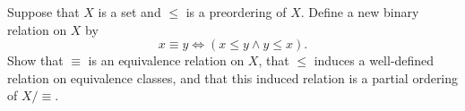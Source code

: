 \begin{problem}[9]
  Suppose that $X$ is a set and $\le$ is a preordering of $X$.
  Define a new binary relation on $X$ by
  \[ x \equiv y \iff (x \le y \land  y \le x). \]
  Show that $\equiv$ is an equivalence relation on $X$,
  that $\le$ induces a well-defined relation on equivalence classes,
  and that this induced relation is a partial ordering of $X/\equiv$.
  
\end{problem}
\begin{Answer}
  
\end{Answer}
